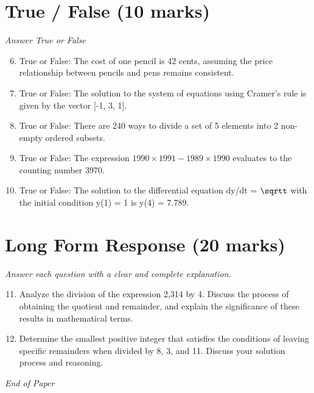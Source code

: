 \documentclass[12pt]{article}
\begin{document}
\section*{True / False (10 marks)}
\textit{Answer True or False}
\begin{enumerate}[label=\arabic*.]
\setcounter{enumi}{5}
\item True or False: The cost of one pencil is 42 cents, assuming the price relationship between pencils and pens remains consistent.
\item True or False: The solution to the system of equations using Cramer's rule is given by the vector [-1, 3, 1].
\item True or False: There are 240 ways to divide a set of 5 elements into 2 non-empty ordered subsets.
\item True or False: The expression $1990\times 1991 - 1989\times 1990$ evaluates to the counting number 3970.
\item True or False: The solution to the differential equation dy/dt = \ensuremath{\sqrtt} with the initial condition y(1) = 1 is y(4) = 7.789.
\end{enumerate}

\section*{Long Form Response (20 marks)}
\textit{Answer each question with a clear and complete explanation.}
\begin{enumerate}[label=\arabic*.]
\setcounter{enumi}{10}
\item Analyze the division of the expression 2,314 by 4. Discuss the process of obtaining the quotient and remainder, and explain the significance of these results in mathematical terms.
\item Determine the smallest positive integer that satisfies the conditions of leaving specific remainders when divided by 8, 3, and 11. Discuss your solution process and reasoning.
\end{enumerate}

\vfill
\noindent\textit{End of Paper}
\end{document}
